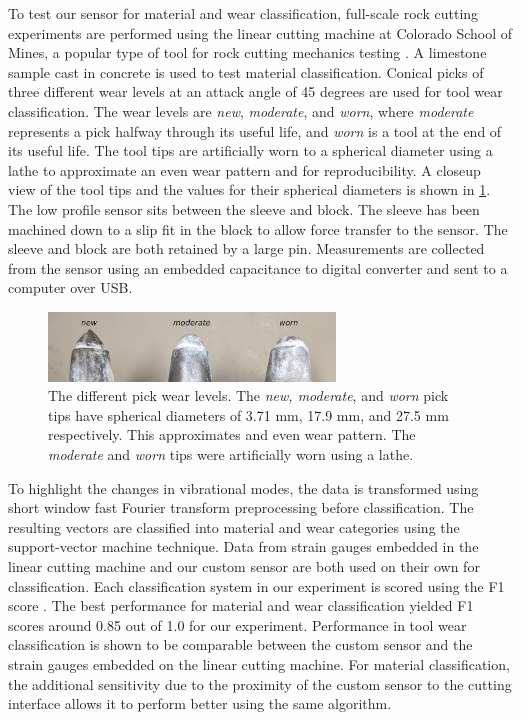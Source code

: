 To test our sensor for material and wear classification, full-scale rock cutting experiments are 
 performed using the linear cutting machine at Colorado School of Mines,
 a popular type of tool for rock cutting mechanics testing \cite{rostami21}.
A limestone sample cast in concrete is used to test material classification. 
Conical picks of three different wear levels at an attack angle of 45 degrees are used for tool wear classification.
The wear levels are \textit{new}, \textit{moderate}, and \textit{worn}, where \textit{moderate}
 represents a pick halfway through its useful life, and \textit{worn} is a tool at the end of its useful life.
The tool tips are artificially worn to a spherical diameter using a lathe 
 to approximate an even wear pattern and for reproducibility.
A closeup view of the tool tips and the values for their spherical diameters is shown in \ref{fig:tips}.
The low profile sensor sits between the sleeve and block.
The sleeve has been machined down to a slip fit in the block to allow force transfer to the sensor.
The sleeve and block are both retained by a large pin.
Measurements are collected from the sensor using an embedded capacitance to digital converter and sent to a 
 computer over USB.

\begin{figure}[t!]
\centering
\includegraphics[width=3in]{figures/p1_media/Fig2.png}
\caption{The different pick wear levels. The \textit{new, moderate}, and \textit{worn}  pick tips
  have spherical diameters of 3.71 mm, 17.9 mm, and 27.5 mm respectively. 
 This approximates and even wear pattern. 
 The \textit{moderate} and \textit{worn} tips were artificially worn using a lathe.}
\label{fig:tips}
\end{figure}

To highlight the changes in vibrational modes, the data is transformed using
 short window fast Fourier transform preprocessing before classification.
The resulting vectors are classified into material and wear categories 
 using the support-vector machine technique. 
Data from strain gauges embedded in the linear cutting machine and our custom sensor are 
 both used on their own for classification.
Each classification system in our experiment is scored using 
 the F1 score \cite{sasaki2007truth, powers2020evaluation}.
The best performance for material and wear classification  
 yielded F1 scores around 0.85 out of 1.0 for our experiment.
Performance in tool wear classification is shown to be comparable between the custom sensor and the 
 strain gauges embedded on the linear cutting machine. For material classification, the additional
 sensitivity due to the proximity of the custom sensor to the cutting interface allows it to 
 perform better using the same algorithm.

